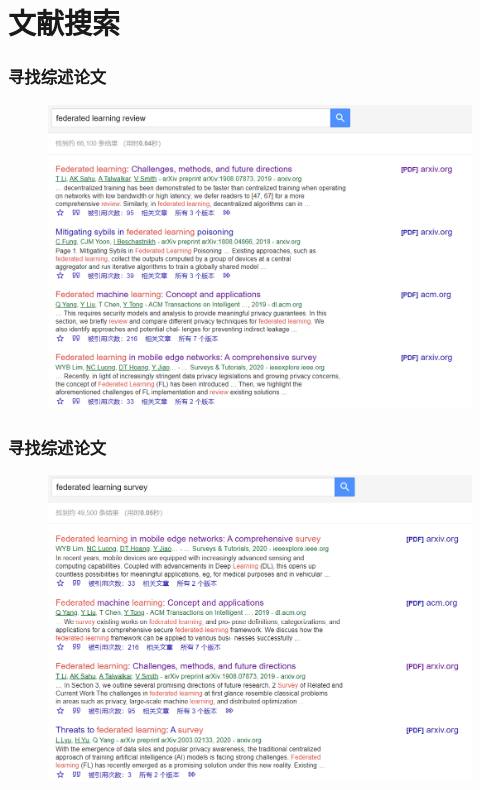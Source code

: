 \documentclass[hyperref={pdfpagelabels=false}]{beamer}
\begin{document}
\section{文献搜索}
\begin{frame}
	\tableofcontents[currentsection]
\end{frame} 
\begin{frame}
	\frametitle{寻找综述论文}
	\begin{figure}
		\centering
		\includegraphics[width=\textwidth]{./figure/2.png}
	\end{figure}
\end{frame}

\begin{frame}
	\frametitle{寻找综述论文}
	\begin{figure}
		\centering
		\includegraphics[width=\textwidth]{./figure/3.png}
	\end{figure}
\end{frame}
\end{document}
